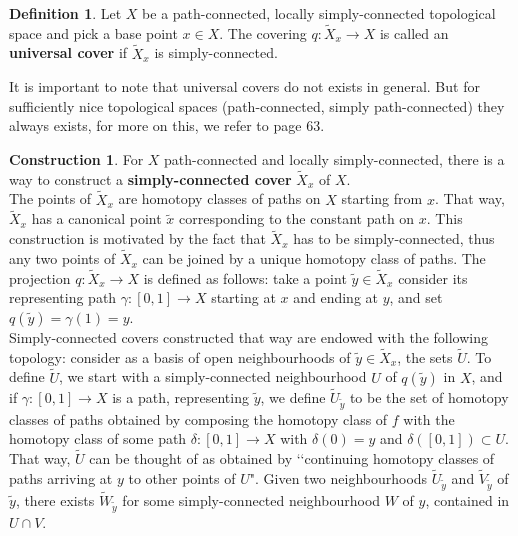 \documentclass{article}
\theoremstyle{plain}
\theoremstyle{definition}
\newtheorem{definition}[theorem]{Definition}
\newtheorem{construction}[theorem]{Construction}
\begin{document}
\begin{definition}
    Let $X$ be a path-connected, locally simply-connected topological space and pick a base point $x\in X$. The covering $q: \widetilde{X}_x \rightarrow X$ is called an \textbf{universal cover} if $\widetilde{X}_x$ is simply-connected.
\end{definition}


\noindent It is important to note that universal covers do not exists in general. 
But for sufficiently nice topological spaces (path-connected, simply path-connected) they always exists,
for more on this, we refer to \cite{Hatcher} page $63$.

\begin{construction}
    For $X$ path-connected and locally simply-connected, there is a way to construct a \textbf{simply-connected cover} $\widetilde{X}_x$ of $X$. \\
    The points of $\widetilde{X}_x$ are homotopy classes of paths on $X$ starting from $x$. 
    That way, $\widetilde{X}_x$ has a canonical point $\widetilde{x}$ corresponding to the constant path on $x$.
    This construction is motivated by the fact that $\widetilde{X}_x$ has to be simply-connected, thus any two points of $\widetilde{X}_x$ can be joined by a unique homotopy class of paths.
    The projection $q: \widetilde{X}_x \rightarrow X$ is defined as follows:
    take a point $\widetilde{y}\in \widetilde{X}_x$ consider its representing path $\gamma:[0,1]\rightarrow X$ starting at $x$ and ending at $y$, and set $q(\widetilde{y})=\gamma(1)=y$.\\
    Simply-connected covers constructed that way are endowed with the following topology: 
    consider as a basis of open neighbourhoods of $\widetilde{y}\in \widetilde{X}_x$, the sets $\widetilde{U}$.
    To define $\widetilde{U}$, we start with a simply-connected neighbourhood $U$ of $q(\widetilde{y})$ in $X$, and if $\gamma:[0,1]\rightarrow X$ is a path, representing $\widetilde{y}$, we define $\widetilde{U}_{\widetilde{y}}$ to be the set of homotopy classes of paths obtained by composing the homotopy class of $f$ with the homotopy class of some path $\delta:[0,1]\rightarrow X$ with $\delta(0) = y$ and $\delta([0,1])\subset U$. 
    That way, $\widetilde{U}$ can be thought of as obtained by ‘‘continuing homotopy classes of paths arriving at $y$ to other points of $U$".
    Given two neighbourhoods $\widetilde{U}_{\widetilde{y}}$ and $\widetilde{V}_{\widetilde{y}}$ of $\widetilde{y}$, there exists $\widetilde{W}_{\widetilde{y}}$ for some simply-connected neighbourhood $W$ of $y$, contained in $U\cap V$.
\end{construction}
\end{document}
